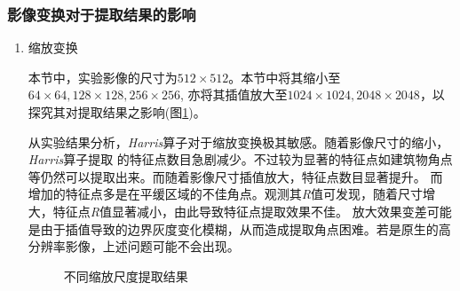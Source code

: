     \subsubsection{影像变换对于提取结果的影响}
    \begin{enumerate}
        \item 缩放变换
        
        \hspace{20pt}本节中，实验影像的尺寸为$512 \times 512$。本节中将其缩小至$64 \times 64,128 \times 128,256 \times 256$,
        亦将其插值放大至$1024 \times 1024,2048 \times 2048$，以探究其对提取结果之影响(图\ref{harris_scale})。

        \hspace{20pt}从实验结果分析，\textit{Harris}算子对于缩放变换极其敏感。随着影像尺寸的缩小，\textit{Harris}算子提取
        的特征点数目急剧减少。不过较为显著的特征点如建筑物角点等仍然可以提取出来。而随着影像尺寸插值放大，特征点数目显著提升。
        而增加的特征点多是在平缓区域的不佳角点。观测其\textit{R}值可发现，随着尺寸增大，特征点\textit{R}值显著减小，由此导致特征点提取效果不佳。
        放大效果变差可能是由于插值导致的边界灰度变化模糊，从而造成提取角点困难。若是原生的高分辨率影像，上述问题可能不会出现。


        \begin{figure}[H]
            \centering
            \caption{不同缩放尺度提取结果}
            \label{harris_scale}
        \end{figure}
    

\end{enumerate}
